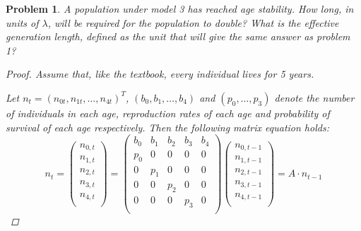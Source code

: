 \documentclass[12pt]{report}
\newtheorem{problem}{Problem}[chapter]
\begin{document}
    \begin{problem}
        A population under model 3 has reached age stability. 
        How long, in units of $\lambda$, will be required for the population to double? 
        What is the effective generation length, defined as the unit that will give the same answer as problem 1?

        \begin{proof}
            Assume that, like the textbook, every individual lives for 5 years.

            Let $n_t = (n_{0t}, n_{1t}, \ldots, n_{4t})^T$, $(b_0, b_1, \ldots, b_4)$ and $(p_0, \ldots, p_3)$ denote the number of individuals in each age, reproduction rates of each age and probability of survival of each age respectively.
            Then the following matrix equation holds:
            \begin{equation*}
                n_t = 
                \begin{pmatrix}
                    n_{0,t}\\
                    n_{1,t}\\
                    n_{2,t}\\
                    n_{3,t}\\
                    n_{4,t}\\
                \end{pmatrix} =  
                \begin{pmatrix}
                    b_0 & b_1 & b_2 & b_3 & b_4 \\
                    p_0 & 0 & 0 & 0 & 0\\
                    0 & p_1 & 0 & 0 & 0\\
                    0 & 0 & p_2 & 0 & 0\\
                    0 & 0 & 0 & p_3 & 0\\
                \end{pmatrix}
                \begin{pmatrix}
                    n_{0,t-1}\\
                    n_{1,t-1}\\
                    n_{2,t-1}\\
                    n_{3,t-1}\\
                    n_{4,t-1}\\
                \end{pmatrix} 
                = A \cdot n_{t-1}
            \end{equation*}


\end{proof}
\end{problem}
\end{document}
